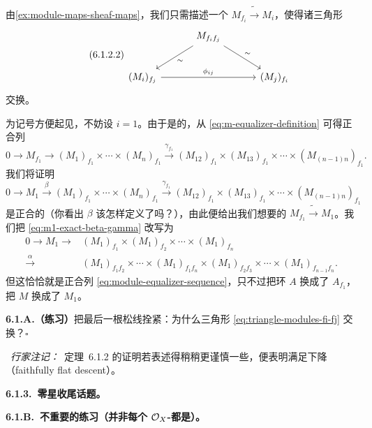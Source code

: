 由\cref{ex:module-maps-sheaf-maps}，我们只需描述一个\trIsomorphism{} $M_{f_i}\tilde{\longrightarrow}M_i$，使得诸三角形
\begin{equation*}\tag{6.1.2.2}\label{eq:triangle-modules-fi-fj}
\begin{tikzcd}[row sep=2.4em, column sep=3.2em]
 & M_{f_if_j} \ar[dl,"\sim"] \ar[dr,"\sim"] \\
(M_i)_{f_j} \ar[rr,"\phi_{ij}"] & & (M_j)_{f_i}
\end{tikzcd}
\end{equation*}
交换。

为记号方便起见，不妨设 $i=1$。由于\trLocalization{}是\trExact{}的，从 \eqref{eq:m-equalizer-definition} 可得正合列
\[
0\longrightarrow M_{f_1}\longrightarrow(M_1)_{f_1}\times\cdots\times(M_n)_{f_1}\overset{\gamma_{f_1}}{\longrightarrow}(M_{12})_{f_1}\times(M_{13})_{f_1}\times\cdots\times(M_{(n-1)n})_{f_1}.
\]
我们将证明
\begin{equation*}\tag{6.1.2.3}\label{eq:m1-exact-beta-gamma}
0\longrightarrow M_1\overset{\beta}{\longrightarrow}(M_1)_{f_1}\times\cdots\times(M_n)_{f_1}\overset{\gamma_{f_1}}{\longrightarrow}(M_{12})_{f_1}\times(M_{13})_{f_1}\times\cdots\times(M_{(n-1)n})_{f_1}
\end{equation*}
是正合的（你看出 $\beta$ 该怎样定义了吗？），由此便给出我们想要的\trIsomorphism{} $M_{f_1}\tilde{\longrightarrow}M_1$。我们把 \eqref{eq:m1-exact-beta-gamma} 改写为
\begin{equation*}\tag{6.1.2.4}\label{eq:m1-rewritten-alpha}
\begin{aligned}
0\longrightarrow M_1\longrightarrow{} &(M_1)_{f_1}\times(M_1)_{f_2}\times\cdots\times(M_1)_{f_n}\\
\overset{\alpha}{\longrightarrow}{} &(M_1)_{f_1f_2}\times\cdots\times(M_1)_{f_1f_n}\times(M_1)_{f_2f_3}\times\cdots\times(M_1)_{f_{n-1}f_n}.
\end{aligned}
\end{equation*}
但这恰恰就是正合列 \eqref{eq:module-equalizer-sequence}，只不过把环 $A$ 换成了 $A_{f_1}$，把\trModule{} $M$ 换成了 $M_1$。

\textbf{6.1.A.（练习）}\quad 把最后一根松线拴紧：为什么三角形 \eqref{eq:triangle-modules-fi-fj} 交换？\hfill$\square$

\extrahard\ \emph{行家注记：}\ 定理~6.1.2 的证明若表述得稍稍更谨慎一些，便表明\trQCSheaf{}满足\trFaithfullyFlat{}下降（faithfully flat descent）。

\textbf{6.1.3.\ 零星收尾话题。}

\textbf{6.1.B.\ 不重要的练习（并非每个 $\mathcal{O}_X$-\trModule{}都是\trQCSheaf）。}\quad

